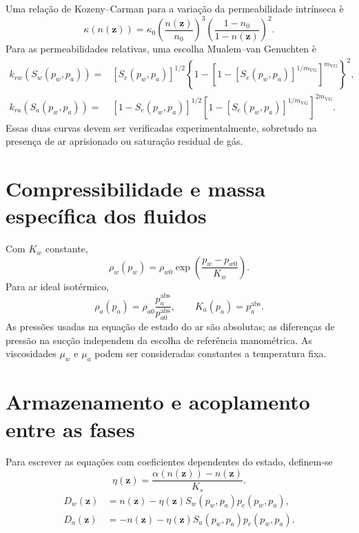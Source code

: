 \documentclass[11pt,a4paper]{article}
\numberwithin{equation}{section}
\begin{document}
Uma rela\c{c}\~ao de Kozeny--Carman para a varia\c{c}\~ao da
permeabilidade intr\'inseca \`e
\begin{equation}
\boxed{\kappa(n(\mathbf z))=\kappa_0
\left(\frac{n(\mathbf z)}{n_0}\right)^3
\left(\frac{1-n_0}{1-n(\mathbf z)}\right)^2.}
\end{equation}
Para as permeabilidades relativas, uma escolha Mualem--van Genuchten \`e
\begin{equation}
\boxed{\begin{aligned}
k_{rw}(S_w(p_w,p_a))={}&[S_e(p_w,p_a)]^{1/2}
\left\{1-\left[1-[S_e(p_w,p_a)]^{1/m_{\mathrm{VG}}}\right]^{m_{\mathrm{VG}}}\right\}^{2},\\
k_{ra}(S_a(p_w,p_a))={}&[1-S_e(p_w,p_a)]^{1/2}
\left[1-[S_e(p_w,p_a)]^{1/m_{\mathrm{VG}}}\right]^{2m_{\mathrm{VG}}}.
\end{aligned}}
\end{equation}
Essas duas curvas devem ser verificadas experimentalmente, sobretudo na
presen\c{c}a de ar aprisionado ou satura\c{c}\~ao residual de g\'as.

\section{Compressibilidade e massa espec\'ifica dos fluidos}\label{sec:fluidos}

Com $K_w$ constante,
\begin{equation}
\boxed{\rho_w(p_w)=\rho_{w0}
\exp\left(\frac{p_w-p_{w0}}{K_w}\right).}
\end{equation}
Para ar ideal isot\'ermico,
\begin{equation}
\boxed{\rho_a(p_a)=\rho_{a0}\frac{p_a^{\mathrm{abs}}}{p_{a0}^{\mathrm{abs}}},
\qquad K_a(p_a)=p_a^{\mathrm{abs}}.}
\end{equation}
As press\~oes usadas na equa\c{c}\~ao de estado do ar s\~ao absolutas;
as diferen\c{c}as de press\~ao na suc\c{c}\~ao independem da escolha de
refer\^encia manom\'etrica. As viscosidades $\mu_w$ e $\mu_a$ podem ser
consideradas constantes a temperatura fixa.

\section{Armazenamento e acoplamento entre as fases}

Para escrever as equa\c{c}\~oes com coeficientes dependentes do estado,
definem-se
\begin{equation}
\boxed{\eta(\mathbf z)=\frac{\alpha(n(\mathbf z))-n(\mathbf z)}{K_s}.}
\end{equation}
\begin{equation}
\boxed{\begin{aligned}
D_w(\mathbf z)&=n(\mathbf z)-\eta(\mathbf z)S_w(p_w,p_a)p_c(p_w,p_a),\\
D_a(\mathbf z)&=-n(\mathbf z)-\eta(\mathbf z)S_a(p_w,p_a)p_c(p_w,p_a).
\end{aligned}}
\end{equation}
\end{document}
